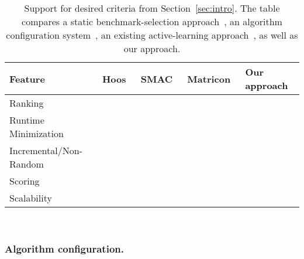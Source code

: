 \documentclass[runningheads]{llncs}
\newcommand{\cmark}{\ding{51}} %
\newcommand{\xmark}{\ding{55}}
\begin{document}
\begin{table}[tbp]
  \centering
  \begin{tabular}{
    m{}
    >{\centering\arraybackslash}m{}
    >{\centering\arraybackslash}m{}
    >{\centering\arraybackslash}m{}
    >{\centering\arraybackslash}m{}
  }
    \hline
    Feature & Hoos~\cite{HoosKSS13} & SMAC~\cite{HutterHL11} & Matricon~\cite{MatriconAFSH21} & Our approach \\
    \hline
    Ranking & \cmark & \xmark & \cmark & \cmark \\
    Runtime Minimization & \xmark & \cmark & \cmark & \cmark \\
    Incremental/Non-Random & \xmark & \xmark & \cmark & \cmark \\
    Scoring & \cmark & \xmark & \xmark & \cmark \\
    Scalability & \cmark & \cmark & \xmark & \cmark \\
    \hline
  \end{tabular}
  ~\\[1em]
  \caption{Support for desired criteria from Section~\ref{sec:intro}.
	The table compares a static benchmark-selection approach~\cite{HoosKSS13}, an algorithm configuration system~\cite{HutterHL11}, an existing active-learning approach~\cite{MatriconAFSH21}, as well as our approach.
  }
  \label{tab:requirements}
\end{table}

\subsubsection{Algorithm configuration.}
\end{document}
